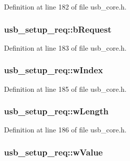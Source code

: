 Definition at line 182 of file usb\-\_\-core.\-h.

\hypertarget{structusb__setup__req_a2205c30d387eb386aec4b91f7b9d6794}{
\subsubsection[{b\-Request}]{ usb\-\_\-setup\-\_\-req\-::b\-Request}}\label{structusb__setup__req_a2205c30d387eb386aec4b91f7b9d6794}


Definition at line 183 of file usb\-\_\-core.\-h.

\hypertarget{structusb__setup__req_a26eb00d046d31e91605f8fc1c164581d}{
\subsubsection[{w\-Index}]{ usb\-\_\-setup\-\_\-req\-::w\-Index}}\label{structusb__setup__req_a26eb00d046d31e91605f8fc1c164581d}


Definition at line 185 of file usb\-\_\-core.\-h.

\hypertarget{structusb__setup__req_ab287b73d688581778da556c9afeffb6b}{
\subsubsection[{w\-Length}]{ usb\-\_\-setup\-\_\-req\-::w\-Length}}\label{structusb__setup__req_ab287b73d688581778da556c9afeffb6b}


Definition at line 186 of file usb\-\_\-core.\-h.

\hypertarget{structusb__setup__req_a8253ffdbf10b56db85acc3377a381c48}{
\subsubsection[{w\-Value}]{ usb\-\_\-setup\-\_\-req\-::w\-Value}}\label{structusb__setup__req_a8253ffdbf10b56db85acc3377a381c48}


